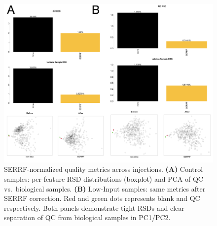 \documentclass[10pt,letterpaper]{article}
\begin{document}
\begin{itemize}
\begin{figure}[htp]
  \centering
  \includegraphics[width=\textwidth]{fig/supp/SuppFig2.png}
  \caption{
    SERRF-normalized quality metrics across injections. 
    {\bf(A)} Control samples: per-feature RSD distributions (boxplot) and PCA of QC vs.\ biological samples. 
    {\bf(B)} Low-Input samples: same metrics after SERRF correction. 
    Red and green dots represents blank and QC respectively. Both panels demonstrate tight RSDs and clear separation of QC from biological samples in PC1/PC2.
  }
  \label{fig:S2}
\end{figure}









\end{itemize}
\end{document}
